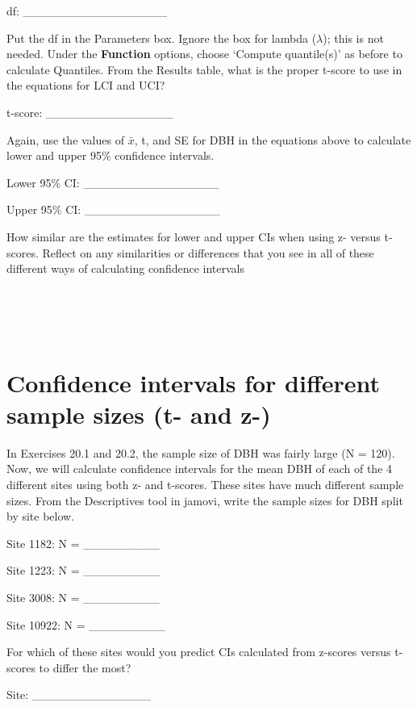 \documentclass[
  openany]{scrbook}
\begin{document}
df: \_\_\_\_\_\_\_\_\_\_\_\_\_\_\_\_\_

Put the df in the Parameters box.
Ignore the box for lambda (\(\lambda\)); this is not needed.
Under the \textbf{Function} options, choose `Compute quantile(s)' as before to calculate Quantiles.
From the Results table, what is the proper t-score to use in the equations for LCI and UCI?

t-score: \_\_\_\_\_\_\_\_\_\_\_\_\_\_\_

Again, use the values of \(\bar{x}\), t, and SE for DBH in the equations above to calculate lower and upper 95\% confidence intervals.

Lower 95\% CI: \_\_\_\_\_\_\_\_\_\_\_\_\_\_\_\_

Upper 95\% CI: \_\_\_\_\_\_\_\_\_\_\_\_\_\_\_\_

How similar are the estimates for lower and upper CIs when using z- versus t-scores.
Reflect on any similarities or differences that you see in all of these different ways of calculating confidence intervals

\begin{verbatim}




\end{verbatim}

\hypertarget{confidence-intervals-for-different-sample-sizes-t--and-z-}{%
\section{Confidence intervals for different sample sizes (t- and z-)}\label{confidence-intervals-for-different-sample-sizes-t--and-z-}}

In Exercises 20.1 and 20.2, the sample size of DBH was fairly large (N = 120).
Now, we will calculate confidence intervals for the mean DBH of each of the 4 different sites using both z- and t-scores.
These sites have much different sample sizes.
From the Descriptives tool in jamovi, write the sample sizes for DBH split by site below.

Site 1182: N = \_\_\_\_\_\_\_\_\_

Site 1223: N = \_\_\_\_\_\_\_\_\_

Site 3008: N = \_\_\_\_\_\_\_\_\_

Site 10922: N = \_\_\_\_\_\_\_\_\_

For which of these sites would you predict CIs calculated from z-scores versus t-scores to differ the most?

Site: \_\_\_\_\_\_\_\_\_\_\_\_\_\_
\end{document}
